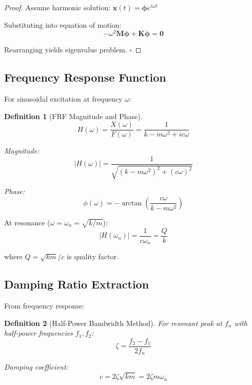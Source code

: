 \documentclass[12pt,a4paper]{article}
\newtheorem{definition}{Definition}
\begin{document}
\begin{proof}
Assume harmonic solution: $\mathbf{x}(t) = \boldsymbol{\phi}e^{i\omega t}$

Substituting into equation of motion:
\begin{equation}
-\omega^2\mathbf{M}\boldsymbol{\phi} + \mathbf{K}\boldsymbol{\phi} = \mathbf{0}
\end{equation}

Rearranging yields eigenvalue problem. $\square$
\end{proof}

\subsection{Frequency Response Function}

For sinusoidal excitation at frequency $\omega$:

\begin{definition}[FRF Magnitude and Phase]
\begin{equation}
H(\omega) = \frac{X(\omega)}{F(\omega)} = \frac{1}{k - m\omega^2 + ic\omega}
\end{equation}

Magnitude:
\begin{equation}
|H(\omega)| = \frac{1}{\sqrt{(k - m\omega^2)^2 + (c\omega)^2}}
\end{equation}

Phase:
\begin{equation}
\phi(\omega) = -\arctan\left(\frac{c\omega}{k - m\omega^2}\right)
\end{equation}
\end{definition}

At resonance ($\omega = \omega_n = \sqrt{k/m}$):
\begin{equation}
|H(\omega_n)| = \frac{1}{c\omega_n} = \frac{Q}{k}
\end{equation}

where $Q = \sqrt{km}/c$ is quality factor.

\subsection{Damping Ratio Extraction}

From frequency response:

\begin{definition}[Half-Power Bandwidth Method]
For resonant peak at $f_n$ with half-power frequencies $f_1, f_2$:
\begin{equation}
\zeta = \frac{f_2 - f_1}{2f_n}
\end{equation}

Damping coefficient:
\begin{equation}
c = 2\zeta\sqrt{km} = 2\zeta m\omega_n
\end{equation}
\end{definition}
\end{document}
